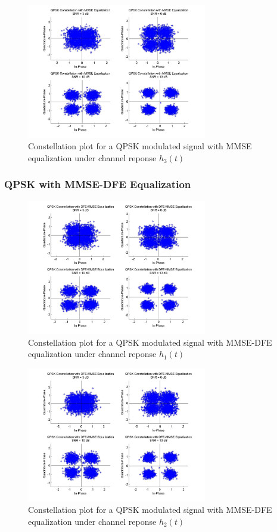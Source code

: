 \documentclass[]{article}
\begin{document}
\begin{figure}[H]
\centering
\includegraphics[width=0.7\textwidth]{qpConstMMSE3.jpg}
\caption{Constellation plot for a QPSK modulated signal with MMSE equalization under channel reponse $h_3(t)$}
\end{figure}

\subsubsection{QPSK with MMSE-DFE Equalization}

\begin{figure}[H]
\centering
\includegraphics[width=0.7\textwidth]{qpConstDFEMMSE1.jpg}
\caption{Constellation plot for a QPSK modulated signal with MMSE-DFE equalization under channel reponse $h_1(t)$}
\end{figure}

\begin{figure}[H]
\centering
\includegraphics[width=0.7\textwidth]{qpConstDFEMMSE2.jpg}
\caption{Constellation plot for a QPSK modulated signal with MMSE-DFE equalization under channel reponse $h_2(t)$}
\end{figure}
\end{document}
